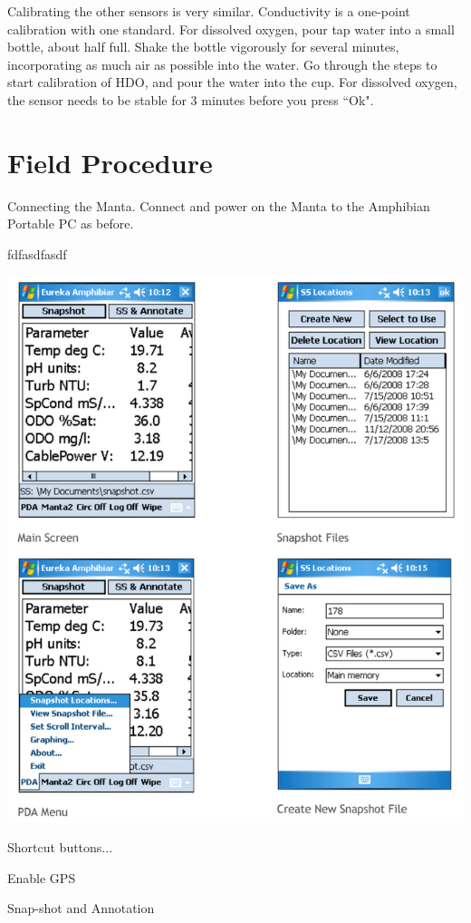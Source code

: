 \documentclass[12pt]{../SOP3_beta}\usepackage[]{graphicx}\usepackage[]{color}
\begin{document}
\NP Calibrating the other sensors is very similar. Conductivity is a one-point calibration with one standard. For dissolved oxygen, pour tap water into a small bottle, about half full. Shake the bottle vigorously for several minutes, incorporating as much air as possible into the water. Go through the steps to start calibration of HDO, and pour the water into the cup. For dissolved oxygen, the sensor needs to be stable for 3 minutes before you press ``Ok". 

\section{Field Procedure}

\NP Connecting the Manta. Connect and power on the Manta to the Amphibian Portable PC as before.

\NP fdfasdfasdf

\includegraphics{AmphibianMain.png}

\NP Shortcut buttons...

\NP Enable GPS

\NP Snap-shot and Annotation
\end{document}
